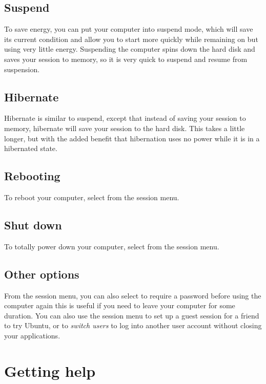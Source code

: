 \subsection{Suspend}
To save energy, you can put your computer into suspend mode, which will save its current condition and allow you to start more quickly while remaining on but using very little energy. Suspending the computer spins down the hard disk and saves your session to memory, so it is very quick to suspend and resume from suspension.

\subsection{Hibernate}

Hibernate is similar to suspend, except that instead of saving your session to memory, hibernate will save your session to the hard disk. This takes a little longer, but with the added benefit that hibernation uses no power while it is in a hibernated state.

\subsection{Rebooting}
To reboot your computer, select  from the session menu.

\subsection{Shut down}
To totally power down your computer, select  from the session menu.

\subsection{Other options}
From the session menu, you can also select  to require a password before using the computer again \dash this is useful if you need to leave your computer for some duration. You can also use the session menu 
to set up a guest session for a friend to try Ubuntu, or to \emph{switch users} to log into another user account without closing your applications.

\section{Getting help}

